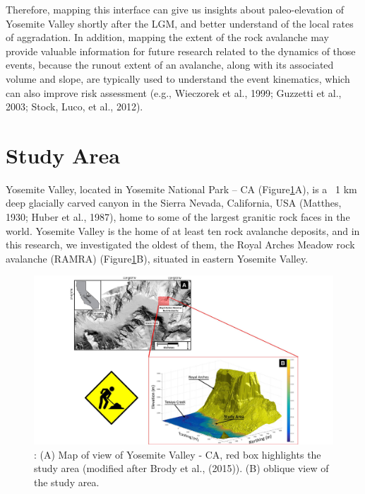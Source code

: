 \documentclass[5p]{elsarticle}
\begin{document}
Therefore, mapping this interface can give us insights about paleo-elevation of Yosemite Valley shortly after the LGM, and better understand of the local rates of aggradation. In addition, mapping the extent of the rock avalanche may provide valuable information for future research related to the dynamics of those events, because the runout extent of an avalanche, along with its associated volume and slope, are typically used to understand the event kinematics, which can also improve risk assessment (e.g., Wieczorek et al., 1999; Guzzetti et al., 2003; Stock, Luco, et al., 2012).





									\section{Study Area}

Yosemite Valley, located in Yosemite National Park – CA (Figure\ref{Study_Area}A), is a ~1  km deep glacially carved canyon in the Sierra Nevada, California, USA (Matthes, 1930; Huber et al., 1987), home to some of the largest granitic rock faces in the world. Yosemite Valley is the home of at least ten rock avalanche deposits, and in this research,  we investigated the oldest of them, the Royal Arches Meadow rock avalanche (RAMRA) (Figure\ref{Study_Area}B), situated in eastern Yosemite Valley. 

										\begin{figure}[h]

	\includegraphics[width=\textwidth]{Figures/Study_Area.pdf}
		\caption{: (A) Map of view of Yosemite Valley - CA, red box highlights the study area (modified after Brody et al., (2015)). (B) oblique view of the study area. \label{Study_Area}}


										\end{figure}
\end{document}
